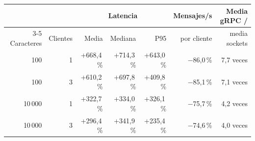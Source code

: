 \begin{tabular}{rrrrrrr}
\toprule
 & & \multicolumn{3}{c}{Latencia} & Mensajes/s & Media gRPC / \\
\cmidrule(lr){3-5}
Caracteres & Clientes & Media & Mediana & P95 & por cliente & media sockets \\
\midrule
100 & 1 & +668,4\,\% & +714,3\,\% & +643,0\,\% & $-$86,0\,\% & 7,7 veces \\
100 & 3 & +610,2\,\% & +697,8\,\% & +409,8\,\% & $-$85,1\,\% & 7,1 veces \\
10\,000 & 1 & +322,7\,\% & +334,0\,\% & +326,1\,\% & $-$75,7\,\% & 4,2 veces \\
10\,000 & 3 & +296,4\,\% & +341,9\,\% & +235,4\,\% & $-$74,6\,\% & 4,0 veces \\
\bottomrule
\end{tabular}
